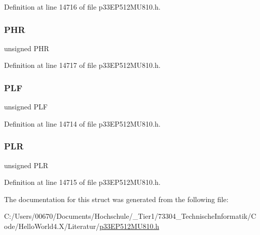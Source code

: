 Definition at line 14716 of file p33\+E\+P512\+M\+U810.\+h.

\mbox{\label{structtag_l_e_b_c_o_n3_b_i_t_s_ae02a9c6926c3a1feac21cec18a520e4a}} 
\subsubsection{\texorpdfstring{P\+HR}{PHR}}
{\footnotesize\ttfamily unsigned P\+HR}



Definition at line 14717 of file p33\+E\+P512\+M\+U810.\+h.

\mbox{\label{structtag_l_e_b_c_o_n3_b_i_t_s_ab72be8b35e01107182afb8e9733d72bb}} 
\subsubsection{\texorpdfstring{P\+LF}{PLF}}
{\footnotesize\ttfamily unsigned P\+LF}



Definition at line 14714 of file p33\+E\+P512\+M\+U810.\+h.

\mbox{\label{structtag_l_e_b_c_o_n3_b_i_t_s_a5f690459b53fc81b46dbbac226cecb25}} 
\subsubsection{\texorpdfstring{P\+LR}{PLR}}
{\footnotesize\ttfamily unsigned P\+LR}



Definition at line 14715 of file p33\+E\+P512\+M\+U810.\+h.



The documentation for this struct was generated from the following file\+:\begin{DoxyCompactItemize}
\item 
C\+:/\+Users/00670/\+Documents/\+Hochschule/\+\_\+\+Tier1/73304\+\_\+\+Technische\+Informatik/\+Code/\+Hello\+World4.\+X/\+Literatur/\hyperlink{p33_e_p512_m_u810_8h}{p33\+E\+P512\+M\+U810.\+h}\end{DoxyCompactItemize}
